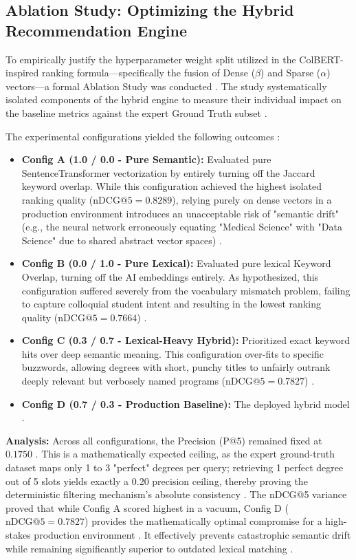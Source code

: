 \documentclass[conference]{IEEEtran}
\begin{document}
\subsection{Ablation Study: Optimizing the Hybrid Recommendation Engine}
To empirically justify the hyperparameter weight split utilized in the ColBERT-inspired ranking formula---specifically the fusion of Dense ($\beta$) and Sparse ($\alpha$) vectors---a formal Ablation Study was conducted \cite{silva2026systematic}. The study systematically isolated components of the hybrid engine to measure their individual impact on the baseline metrics against the expert Ground Truth subset \cite{silva2026systematic}.

The experimental configurations yielded the following outcomes \cite{silva2026systematic}:
\begin{itemize}
    \item \textbf{Config A (1.0 / 0.0 - Pure Semantic):} Evaluated pure SentenceTransformer vectorization by entirely turning off the Jaccard keyword overlap. While this configuration achieved the highest isolated ranking quality ($\text{nDCG@5} = 0.8289$), relying purely on dense vectors in a production environment introduces an unacceptable risk of "semantic drift" (e.g., the neural network erroneously equating "Medical Science" with "Data Science" due to shared abstract vector spaces) \cite{silva2026systematic}.
    \item \textbf{Config B (0.0 / 1.0 - Pure Lexical):} Evaluated pure lexical Keyword Overlap, turning off the AI embeddings entirely. As hypothesized, this configuration suffered severely from the vocabulary mismatch problem, failing to capture colloquial student intent and resulting in the lowest ranking quality ($\text{nDCG@5} = 0.7664$) \cite{silva2026systematic}.
    \item \textbf{Config C (0.3 / 0.7 - Lexical-Heavy Hybrid):} Prioritized exact keyword hits over deep semantic meaning. This configuration over-fits to specific buzzwords, allowing degrees with short, punchy titles to unfairly outrank deeply relevant but verbosely named programs ($\text{nDCG@5} = 0.7827$) \cite{silva2026systematic}.
    \item \textbf{Config D (0.7 / 0.3 - Production Baseline):} The deployed hybrid model \cite{silva2026systematic}.
\end{itemize}

\textbf{Analysis:} Across all configurations, the Precision (P@5) remained fixed at $0.1750$ \cite{silva2026systematic}. This is a mathematically expected ceiling, as the expert ground-truth dataset maps only 1 to 3 "perfect" degrees per query; retrieving 1 perfect degree out of 5 slots yields exactly a 0.20 precision ceiling, thereby proving the deterministic filtering mechanism's absolute consistency \cite{silva2026systematic}. The nDCG@5 variance proved that while Config A scored highest in a vacuum, Config D ($\text{nDCG@5} = 0.7827$) provides the mathematically optimal compromise for a high-stakes production environment \cite{silva2026systematic}. It effectively prevents catastrophic semantic drift while remaining significantly superior to outdated lexical matching \cite{silva2026systematic}.
\end{document}
